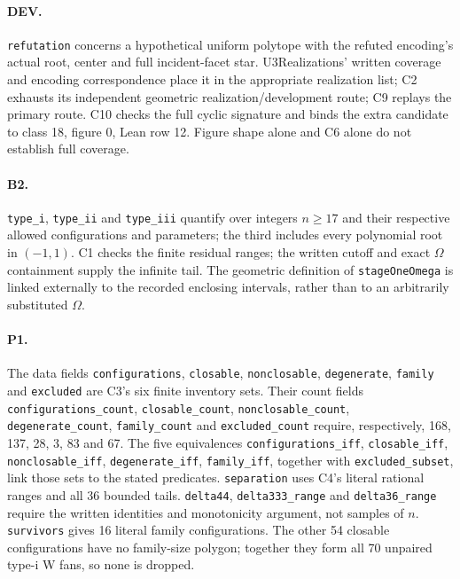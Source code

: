 \documentclass[11pt]{article}
\theoremstyle{definition}
\theoremstyle{remark}
\begin{document}
\paragraph{DEV.}
\texttt{refutation} concerns a hypothetical uniform polytope with the
refuted encoding's actual root, center and full incident-facet star.
U3Realizations' written coverage and encoding correspondence place it in
the appropriate realization list; C2 exhausts its independent geometric
realization/development route; C9 replays the primary route. C10 checks
the full cyclic signature and binds the extra candidate to class 18,
figure 0, Lean row 12. Figure shape alone and C6 alone do not establish full coverage.

\paragraph{B2.}
\texttt{type\_i}, \texttt{type\_ii} and \texttt{type\_iii} quantify
over integers $n\ge17$ and their respective allowed configurations and
parameters; the third includes every polynomial root in $(-1,1)$. C1
checks the finite residual ranges; the written cutoff and exact
$\Omega$ containment supply the infinite tail. The geometric definition
of \texttt{stageOneOmega} is linked externally to the recorded enclosing
intervals, rather than to an arbitrarily substituted $\Omega$.

\paragraph{P1.}
The data fields \texttt{configurations}, \texttt{closable},
\texttt{nonclosable}, \texttt{degenerate}, \texttt{family} and
\texttt{excluded} are C3's six finite inventory sets. Their count fields
\texttt{configurations\_count}, \texttt{closable\_count},
\texttt{nonclosable\_count}, \texttt{degenerate\_count},
\texttt{family\_count} and \texttt{excluded\_count} require, respectively,
168, 137, 28, 3, 83 and 67. The five equivalences
\texttt{configurations\_iff}, \texttt{closable\_iff},
\texttt{nonclosable\_iff}, \texttt{degenerate\_iff},
\texttt{family\_iff}, together with \texttt{excluded\_subset},
link those sets to the stated predicates.
\texttt{separation} uses C4's literal
rational ranges and all 36 bounded tails. \texttt{delta44},
\texttt{delta333\_range} and \texttt{delta36\_range} require the written
identities and monotonicity argument, not samples of $n$.
\texttt{survivors} gives 16 literal family configurations. The other 54
closable configurations have no family-size polygon; together they form
all 70 unpaired type-i W fans, so none is dropped.
\end{document}
